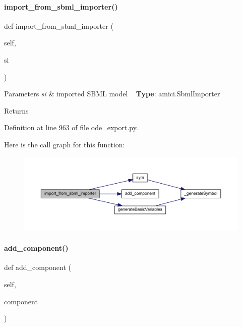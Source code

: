 \paragraph{\texorpdfstring{import\_from\_sbml\_importer()}{import\_from\_sbml\_importer()}}
{\footnotesize\ttfamily def import\+\_\+from\+\_\+sbml\+\_\+importer (\begin{DoxyParamCaption}\item[{}]{self,  }\item[{}]{si }\end{DoxyParamCaption})}


\begin{DoxyParams}{Parameters}
{\em si} & imported S\+B\+ML model ~\newline
{\bfseries{Type}}\+: amici.\+Sbml\+Importer\\
\hline
\end{DoxyParams}
\begin{DoxyReturn}{Returns}

\end{DoxyReturn}


Definition at line 963 of file ode\+\_\+export.\+py.

Here is the call graph for this function\+:
\nopagebreak
\begin{figure}[H]
\begin{center}
\leavevmode
\includegraphics[width=350pt]{classamici_1_1ode__export_1_1_o_d_e_model_a3a3ebfdaf0d1f08adf028afb10d5b5c1_cgraph}
\end{center}
\end{figure}
\mbox{\label{classamici_1_1ode__export_1_1_o_d_e_model_a2731bd07d8e64b54d6b455d6d8441f13}} 
\paragraph{\texorpdfstring{add\_component()}{add\_component()}}
{\footnotesize\ttfamily def add\+\_\+component (\begin{DoxyParamCaption}\item[{}]{self,  }\item[{}]{component }\end{DoxyParamCaption})}


